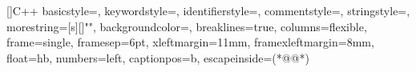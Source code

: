 	[]{C++}
	{
	basicstyle=\rmfamily,%
	keywordstyle={\color{cpp_key_col}\bfseries},
	identifierstyle={\color{cpp_idn_col}},
	commentstyle={\color{cpp_com_col}},
	stringstyle=\color{cpp_str_col},
	morestring=[s][\color{cpp_str_col}]{"}{"},
	backgroundcolor={\color{white}},
	breaklines=true,
	columns=flexible,
	frame=single,
	framesep=6pt,
	xleftmargin=11mm,
	framexleftmargin=8mm,
	float=hb,   %
	numbers=left,	
	captionpos=b, %
	escapeinside={(*@}{@*)}
	}